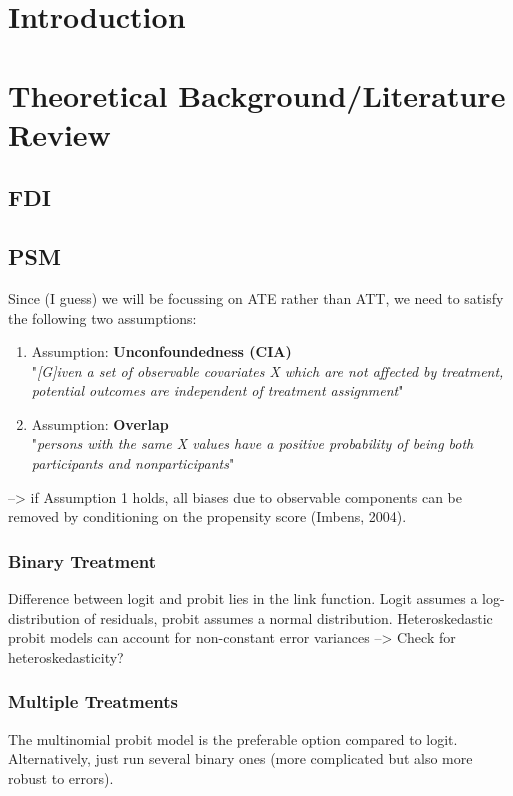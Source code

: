 \documentclass[a4paper,11pt]{scrartcl}
\begin{document}
\section{Introduction}



\section{Theoretical Background/Literature Review}

\subsection{FDI}

\subsection{PSM}
Since (I guess) we will be focussing on ATE rather than ATT, we need to satisfy the following two assumptions: 

\begin{enumerate}
\item Assumption: \textbf{Unconfoundedness (CIA)} \\
"\textit{[G]iven a set of observable covariates X which are not affected by treatment, potential outcomes are independent of treatment assignment}"   \citep[p.~35]{CaliendoHujerThomsen2008}	 

\item Assumption: \textbf{Overlap} \\
"\textit{persons with the same X values have a positive probability of being both participants and nonparticipants}" \citet [p.~35]{Caliendo08}

\end{enumerate}
--> if Assumption 1 holds, all biases due to observable components can be removed by conditioning on the propensity score (Imbens, 2004).

\subsubsection*{Binary Treatment}
Difference between logit and probit lies in the link function. Logit assumes a log-distribution of residuals, probit assumes a normal distribution. Heteroskedastic probit models can account for non-constant error variances --> Check for heteroskedasticity?

\subsubsection*{Multiple Treatments}
The multinomial probit model is the preferable option compared to logit. Alternatively, just run several binary ones (more complicated but also more robust to errors).
\end{document}
